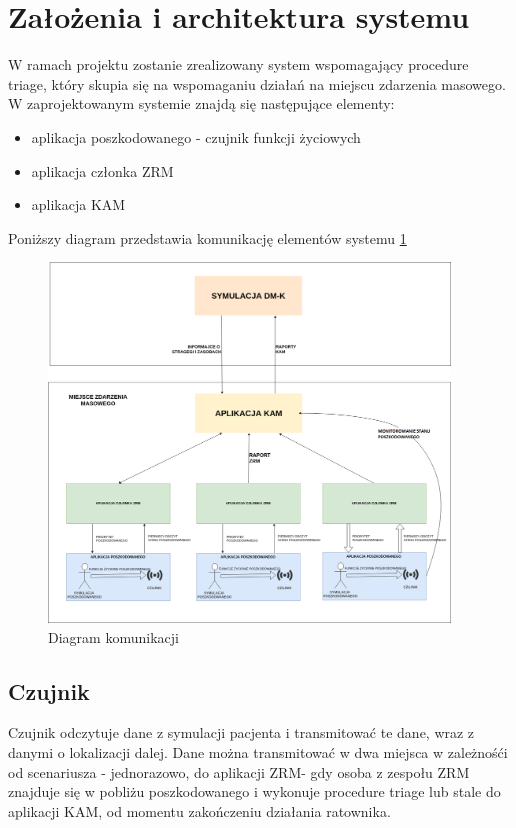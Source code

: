 \documentclass[11pt]{report}
\begin{document}
\section{Założenia i architektura systemu}
W ramach projektu zostanie zrealizowany system wspomagający procedure triage, który skupia się na wspomaganiu działań na miejscu zdarzenia masowego. W zaprojektowanym systemie znajdą się następujące elementy:
\begin{itemize}
    \item aplikacja poszkodowanego - czujnik funkcji życiowych
    \item aplikacja członka ZRM
    \item aplikacja KAM
\end{itemize}
Poniższy diagram przedstawia komunikację elementów systemu \ref{fig:arch}
\begin{figure}[h!]
  \centering
    \includegraphics[width=0.95\textwidth]{img/arch.png}
  \caption{Diagram komunikacji}
  \label{fig:arch}
\end{figure}
\subsection{Czujnik}
Czujnik odczytuje dane z symulacji pacjenta i transmitować te dane, wraz z danymi o lokalizacji dalej. Dane można transmitować w dwa miejsca w zależnośći od scenariusza - jednorazowo, do aplikacji ZRM- gdy osoba z zespołu ZRM znajduje się w pobliżu poszkodowanego i wykonuje procedure triage lub stale do aplikacji KAM, od momentu zakończeniu działania ratownika.
\end{document}
